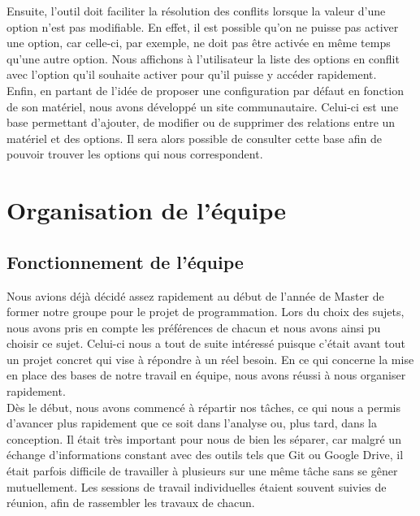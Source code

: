 \documentclass[16pts]{report}
\begin{document}
Ensuite, l'outil doit faciliter la résolution des conflits lorsque la 
valeur d'une option n'est pas modifiable. En effet, il est possible qu'on 
ne puisse pas activer une option, car celle-ci, par exemple, ne doit 
pas être activée en même temps qu'une autre option. Nous affichons 
à l'utilisateur la liste des options en conflit avec l'option qu'il 
souhaite activer pour qu'il puisse y accéder rapidement.
\\

Enfin, en partant de l'idée de proposer une configuration par défaut en 
fonction de son matériel, nous avons développé un site communautaire. 
Celui-ci est une base permettant d'ajouter, de modifier ou de supprimer 
des relations entre un matériel et des options. Il sera alors possible de 
consulter cette base afin de pouvoir trouver les options qui nous 
correspondent.
\\

\chapter{Organisation de l'équipe}
\label{cha:Organisation de l'équipe}
    \section{Fonctionnement de l'équipe}
    \label{sec:Fonctionnement de l'équipe}

Nous avions déjà décidé assez rapidement au début de l'année de Master 
de former notre groupe pour le projet de programmation. Lors du choix 
des sujets, nous avons pris en compte les préférences de chacun et nous 
avons ainsi pu choisir ce sujet. Celui-ci nous a tout de suite intéressé 
puisque c'était avant tout un projet concret qui vise à répondre à un 
réel besoin.
En ce qui concerne la mise en place des bases de notre travail en 
équipe, nous avons réussi à nous organiser rapidement. 
\\

Dès le début, nous avons commencé à répartir nos tâches, ce qui nous a 
permis d’avancer plus rapidement que ce soit dans l’analyse ou, plus tard, 
dans la conception. Il était très important pour nous de bien les séparer, 
car malgré un échange d’informations constant avec des outils tels que 
Git ou Google Drive, il était parfois difficile de travailler à plusieurs 
sur une même tâche sans se gêner mutuellement. Les sessions de travail 
individuelles étaient souvent suivies de réunion, afin de rassembler 
les travaux de chacun.
\\
\end{document}
